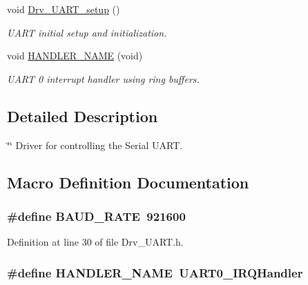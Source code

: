 \begin{DoxyCompactItemize}
void \hyperlink{group__UART__Library_ga8026f78d22425b39818431d299d638a3}{Drv\+\_\+\+U\+A\+R\+T\+\_\+setup} ()
\begin{DoxyCompactList}\small\item\em U\+A\+RT initial setup and initialization. \end{DoxyCompactList}\item 
void \hyperlink{group__UART__Library_gab1ae01fa9bacc6e16c6aff7f1e055b1d}{H\+A\+N\+D\+L\+E\+R\+\_\+\+N\+A\+ME} (void)
\begin{DoxyCompactList}\small\item\em U\+A\+RT 0 interrupt handler using ring buffers. \end{DoxyCompactList}\end{DoxyCompactItemize}


\subsection{Detailed Description}
\char`\"{}\char`\"{} Driver for controlling the Serial U\+A\+RT. 

\subsection{Macro Definition Documentation}
\subsubsection[{\texorpdfstring{B\+A\+U\+D\+\_\+\+R\+A\+TE}{BAUD_RATE}}]{\setlength{\rightskip}{0pt plus 5cm}\#define B\+A\+U\+D\+\_\+\+R\+A\+TE~921600}\hypertarget{group__UART__Library_gad4455691936f92fdd6c37566fc58ba1f}{}\label{group__UART__Library_gad4455691936f92fdd6c37566fc58ba1f}


Definition at line 30 of file Drv\+\_\+\+U\+A\+R\+T.\+h.

\subsubsection[{\texorpdfstring{H\+A\+N\+D\+L\+E\+R\+\_\+\+N\+A\+ME}{HANDLER_NAME}}]{\setlength{\rightskip}{0pt plus 5cm}\#define H\+A\+N\+D\+L\+E\+R\+\_\+\+N\+A\+ME~U\+A\+R\+T0\+\_\+\+I\+R\+Q\+Handler}\hypertarget{group__UART__Library_gafa87a27ed6f715eb90d4db80687e93bf}{}\label{group__UART__Library_gafa87a27ed6f715eb90d4db80687e93bf}


